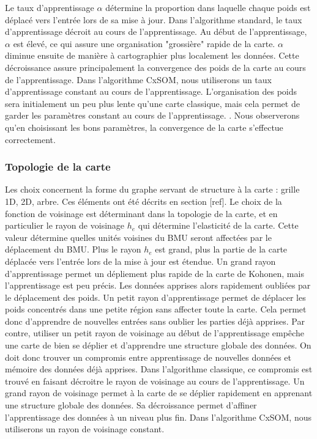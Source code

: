 Le taux d'apprentissage $\alpha$ détermine la proportion dans laquelle chaque poids est déplacé vers l'entrée lors de sa mise à jour. Dans l'algorithme standard, le taux d'apprentissage décroit au cours de l'apprentissage. Au début de l'apprentissage, $\alpha$ est élevé, ce qui assure une organisation "grossière" rapide de la carte. $\alpha$ diminue ensuite de manière à cartographier plus localement les données. Cette décroissance assure principalement la convergence des poids de la carte au cours de l'apprentissage.
Dans l'algorithme CxSOM, nous utiliserons un taux d'apprentissage constant au cours de l'apprentissage. L'organisation des poids sera initialement un peu plus lente qu'une carte classique, mais cela permet de garder les paramètres constant au cours de l'apprentissage.
.
Nous observerons qu'en choisissant les bons paramètres, la convergence de la carte s'effectue correctement.

\subsubsection{Topologie de la carte}
Les choix concernent la forme du graphe servant de structure à la carte : grille 1D, 2D, arbre. Ces éléments ont été décrits en section [ref].
Le choix de la fonction de voisinage est déterminant dans la topologie de la carte, et en particulier le rayon de voisinage $h_e$ qui détermine l'elasticité de la carte.
Cette valeur détermine quelles unités voisines du BMU seront affectées par le déplacement du BMU.
Plus le rayon $h_e$ est grand, plus la partie de la carte déplacée vers l'entrée lors de la mise à jour est étendue. Un grand rayon d'apprentissage permet un dépliement plus rapide de la carte de Kohonen, mais l'apprentissage est peu précis. Les données apprises alors rapidement oubliées par le déplacement des poids.
Un petit rayon d'apprentissage permet de déplacer les poids concentrés dans une petite région sans affecter toute la carte. Cela permet donc d'apprendre de nouvelles entrées sans oublier les parties déjà apprises. Par contre, utiliser un petit rayon de voisinage au début de l'apprentissage empêche une carte de bien se déplier et d'apprendre une structure globale des données. On doit donc trouver un compromis entre apprentissage de nouvelles données et mémoire des données déjà apprises.
Dans l'algorithme classique, ce compromis est trouvé en faisant décroitre le rayon de voisinage au cours de l'apprentissage. Un grand rayon de voisinage permet à la carte de se déplier rapidement en apprenant une structure globale des données. Sa décroissance permet d'affiner l'apprentissage des données à un niveau plus fin. 
Dans l'algorithme CxSOM, nous utiliserons un rayon de voisinage constant.

